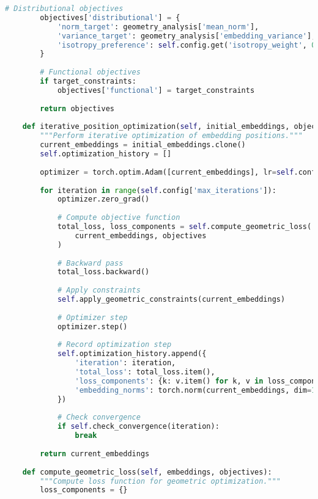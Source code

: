 \begin{lstlisting}[language=Python, caption=Geometric embedding optimization framework]
        # Distributional objectives
        objectives['distributional'] = {
            'norm_target': geometry_analysis['mean_norm'],
            'variance_target': geometry_analysis['embedding_variance'],
            'isotropy_preference': self.config.get('isotropy_weight', 0.05)
        }
        
        # Functional objectives
        if target_constraints:
            objectives['functional'] = target_constraints
        
        return objectives
    
    def iterative_position_optimization(self, initial_embeddings, objectives):
        """Perform iterative optimization of embedding positions."""
        current_embeddings = initial_embeddings.clone()
        self.optimization_history = []
        
        optimizer = torch.optim.Adam([current_embeddings], lr=self.config['learning_rate'])
        
        for iteration in range(self.config['max_iterations']):
            optimizer.zero_grad()
            
            # Compute objective function
            total_loss, loss_components = self.compute_geometric_loss(
                current_embeddings, objectives
            )
            
            # Backward pass
            total_loss.backward()
            
            # Apply constraints
            self.apply_geometric_constraints(current_embeddings)
            
            # Optimizer step
            optimizer.step()
            
            # Record optimization step
            self.optimization_history.append({
                'iteration': iteration,
                'total_loss': total_loss.item(),
                'loss_components': {k: v.item() for k, v in loss_components.items()},
                'embedding_norms': torch.norm(current_embeddings, dim=1).tolist()
            })
            
            # Check convergence
            if self.check_convergence(iteration):
                break
        
        return current_embeddings
    
    def compute_geometric_loss(self, embeddings, objectives):
        """Compute loss function for geometric optimization."""
        loss_components = {}
        

\end{lstlisting}
